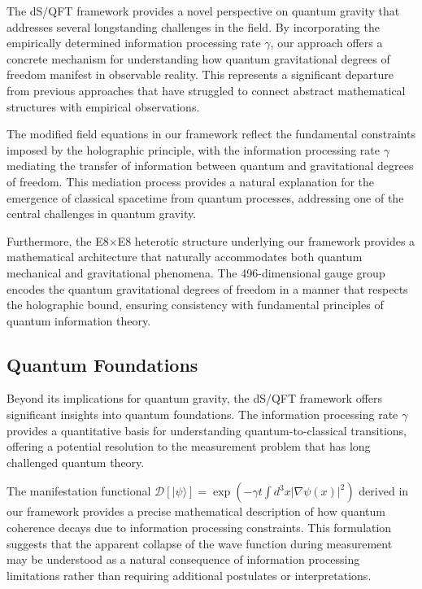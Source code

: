 \documentclass[11pt,english,twoside]{article}
\theoremstyle{plain}
\theoremstyle{definition}
\theoremstyle{remark}
\newcommand{\D}{{\mathcal{D}}}
\newcommand{\gammaR}{\gamma}
\begin{document}
The dS/QFT framework provides a novel perspective on quantum gravity that addresses several longstanding challenges in the field. By incorporating the empirically determined information processing rate $\gammaR$, our approach offers a concrete mechanism for understanding how quantum gravitational degrees of freedom manifest in observable reality. This represents a significant departure from previous approaches that have struggled to connect abstract mathematical structures with empirical observations.

The modified field equations in our framework reflect the fundamental constraints imposed by the holographic principle, with the information processing rate $\gammaR$ mediating the transfer of information between quantum and gravitational degrees of freedom. This mediation process provides a natural explanation for the emergence of classical spacetime from quantum processes, addressing one of the central challenges in quantum gravity.

Furthermore, the E8$\times$E8 heterotic structure underlying our framework provides a mathematical architecture that naturally accommodates both quantum mechanical and gravitational phenomena. The 496-dimensional gauge group encodes the quantum gravitational degrees of freedom in a manner that respects the holographic bound, ensuring consistency with fundamental principles of quantum information theory.

\subsection{Quantum Foundations}
\label{subsec:quantum_foundations}

Beyond its implications for quantum gravity, the dS/QFT framework offers significant insights into quantum foundations. The information processing rate $\gammaR$ provides a quantitative basis for understanding quantum-to-classical transitions, offering a potential resolution to the measurement problem that has long challenged quantum theory.

The manifestation functional $\D[|\psi\rangle] = \exp(-\gammaR t\int d^3x |\nabla\psi(x)|^2)$ derived in our framework provides a precise mathematical description of how quantum coherence decays due to information processing constraints. This formulation suggests that the apparent collapse of the wave function during measurement may be understood as a natural consequence of information processing limitations rather than requiring additional postulates or interpretations.
\end{document}
